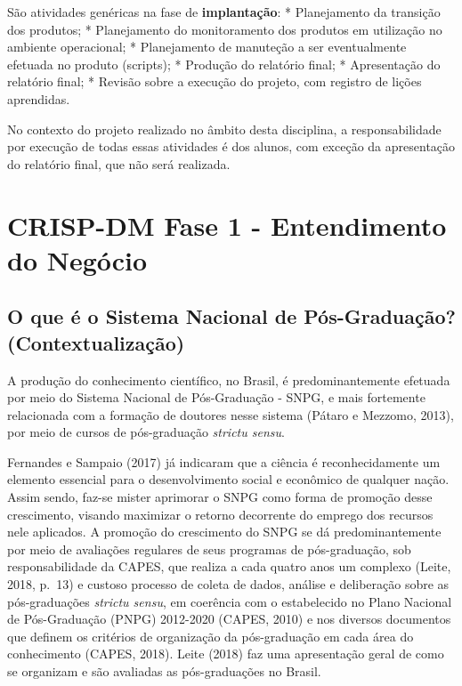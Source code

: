 \documentclass[]{article}
\begin{document}
São atividades genéricas na fase de \textbf{implantação}: * Planejamento
da transição dos produtos; * Planejamento do monitoramento dos produtos
em utilização no ambiente operacional; * Planejamento de manuteção a ser
eventualmente efetuada no produto (scripts); * Produção do relatório
final; * Apresentação do relatório final; * Revisão sobre a execução do
projeto, com registro de lições aprendidas.

No contexto do projeto realizado no âmbito desta disciplina, a
responsabilidade por execução de todas essas atividades é dos alunos,
com exceção da apresentação do relatório final, que não será realizada.

\section{CRISP-DM Fase 1 - Entendimento do
Negócio}\label{crisp-dm-fase-1---entendimento-do-negocio}

\subsection{O que é o Sistema Nacional de Pós-Graduação?
(Contextualização)}\label{o-que-e-o-sistema-nacional-de-pos-graduacao-contextualizacao}

A produção do conhecimento científico, no Brasil, é predominantemente
efetuada por meio do Sistema Nacional de Pós-Graduação - SNPG, e mais
fortemente relacionada com a formação de doutores nesse sistema (Pátaro
e Mezzomo, 2013), por meio de cursos de pós-graduação \emph{strictu
sensu}.

Fernandes e Sampaio (2017) já indicaram que a ciência é reconhecidamente
um elemento essencial para o desenvolvimento social e econômico de
qualquer nação. Assim sendo, faz-se mister aprimorar o SNPG como forma
de promoção desse crescimento, visando maximizar o retorno decorrente do
emprego dos recursos nele aplicados. A promoção do crescimento do SNPG
se dá predominantemente por meio de avaliações regulares de seus
programas de pós-graduação, sob responsabilidade da CAPES, que realiza a
cada quatro anos um complexo (Leite, 2018, p.~13) e custoso processo de
coleta de dados, análise e deliberação sobre as pós-graduações
\emph{strictu sensu}, em coerência com o estabelecido no Plano Nacional
de Pós-Graduação (PNPG) 2012-2020 (CAPES, 2010) e nos diversos
documentos que definem os critérios de organização da pós-graduação em
cada área do conhecimento (CAPES, 2018). Leite (2018) faz uma
apresentação geral de como se organizam e são avaliadas as
pós-graduações no Brasil.
\end{document}
